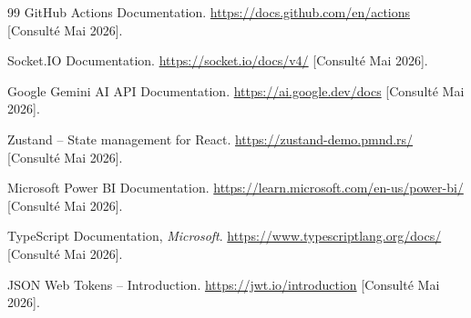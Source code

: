 \begin{thebibliography}{99}
    GitHub Actions Documentation.
    \url{https://docs.github.com/en/actions}
    [Consulté Mai 2026].

    Socket.IO Documentation.
    \url{https://socket.io/docs/v4/}
    [Consulté Mai 2026].

    Google Gemini AI API Documentation.
    \url{https://ai.google.dev/docs}
    [Consulté Mai 2026].

    Zustand -- State management for React.
    \url{https://zustand-demo.pmnd.rs/}
    [Consulté Mai 2026].

    Microsoft Power BI Documentation.
    \url{https://learn.microsoft.com/en-us/power-bi/}
    [Consulté Mai 2026].

    TypeScript Documentation, \textit{Microsoft}.
    \url{https://www.typescriptlang.org/docs/}
    [Consulté Mai 2026].

    JSON Web Tokens -- Introduction.
    \url{https://jwt.io/introduction}
    [Consulté Mai 2026].

\end{thebibliography}
